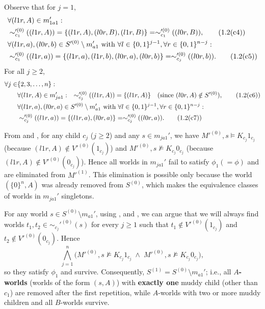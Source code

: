 Observe that for $j=1$,
\begin{align*}
    &\forall (l1r,A) \in m_{1a1}': \\ 
        &\sim_{c_1}'^{(0)}((l1r,A)) = \{(l1r,A),(l0r,B),(l1r,B)\} 
        = \sim_{c_1}'^{(0)}((l0r,B)), \tag{1.2(c4)}\label{eq:1.2(c4)}\\
    &\forall (l1r,a),(l0r,b) \in S'^{(0)} \setminus m'_{a1} 
        \text{ with } \forall l \in \{0,1\}^{j-1}, \forall r \in \{0,1\}^{n-j}: \\ 
        &\sim_{c_1}'^{(0)}((l1r,a)) = 
        \{(l1r,a),(l1r,b),(l0r,a),(l0r,b)\} = \sim_{c_j}'^{(0)}((l0r,b)). 
        \tag{1.2(c5)}\label{eq:1.2(c5)}
\end{align*}
For all $j \ge 2$,
\begin{align*}
    \forall j \in &\{2,3,\dots,n\}: \\
    &\forall (l1r,A) \in m_{ja1}': \quad 
        \sim_{c_j}'^{(0)}((l1r,A)) = \{(l1r,A)\} 
        \quad (\text{since } (l0r,A) \notin S'^{(0)}), 
            \tag{1.2(c6)}\label{eq:1.2(c6)}\\
    &\forall (l1r,a),(l0r,a) \in S'^{(0)} \setminus m'_{a1} 
        \text{ with } \forall l \in \{0,1\}^{j-1}, \forall r \in \{0,1\}^{n-j}: \\ 
        &\sim_{c_j}'^{(0)}((l1r,a)) = \{(l1r,a),(l0r,a)\} = 
        \sim_{c_j}'^{(0)}((l0r,a)). \tag{1.2(c7)}\label{eq:1.2(c7)}
\end{align*}

From  and , 
for any child $c_j$ ($j \ge 2$) and any $s \in m_{ja1}'$,
we have $M'^{(0)},s \models K_{c_j}1_{c_j}$ 
(because $(l1r,A) \notin V'^{(0)}(1_{c_j})$) and 
$M'^{(0)},s \not\models K_{c_j}0_{c_j}$ 
(because $(l1r,A) \notin V'^{(0)}(0_{c_j})$). 
Hence all worlds in $m_{ja1}'$ fail to satisfy $\phi_1(=\phi)$ 
and are eliminated from $M'^{(1)}$. This elimination is possible 
only because the world $(\{0\}^n,A)$ was already removed from $S^{(0)}$, 
which makes the equivalence classes of worlds in $m_{ja1}'$ singletons.

For any world $s \in S^{(0)} \setminus m_{a1}'$, using , 
 and , we can argue that we will always 
find worlds $t_1,t_2 \in \sim_{c_j}'^{(0)}(s)$ for every $j \ge 1$ 
such that $t_1 \notin V'^{(0)}(1_{c_j})$ and $t_2 \notin V'^{(0)}(0_{c_j})$. 
Hence
\[
\bigwedge_{j=1}^{n} \big( M'^{(0)},s \not\models K_{c_j}1_{c_j} 
\;\land\; M'^{(0)},s \not\models K_{c_j}0_{c_j} \big),
\]
so they satisfy $\phi_1$ and survive. Consequently,
$S^{(1)} = S^{(0)} \setminus m_{a1}'$; i.e., all \textbf{$A$-worlds} 
(worlds of the form $(s,A)$) with \textbf{exactly one} muddy child 
(other than $c_1$) are removed after the first repetition, 
while $A$-worlds with two or more muddy children and all $B$-worlds survive.

